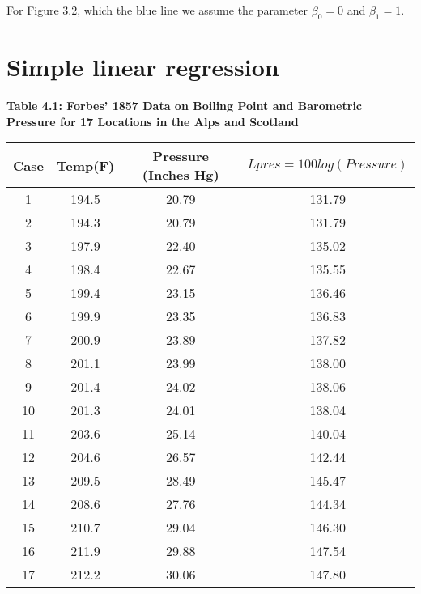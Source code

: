 \documentclass{article}
\begin{document}
\begin{center}
    \end{center}
    
    For Figure 3.2, which the blue line we assume the parameter ${\beta _{0} = 0}$ and ${\beta _{1} = 1}$.
    
\section{Simple linear regression} 

    \begin{center}
        \textbf{Table 4.1: Forbes’ 1857 Data on Boiling Point and Barometric Pressure for 17 Locations in the Alps and Scotland}
        
        \begin{tabular}{|cccc|}
            \hline 
            Case & Temp(F) & Pressure (Inches Hg) & ${Lpres=100log(Pressure)}$ \\
            \hline
            1 & 194.5 & 20.79 & 131.79 \\
            2 & 194.3 & 20.79 & 131.79 \\
            3 & 197.9 & 22.40 & 135.02 \\
            4 & 198.4 & 22.67 & 135.55 \\
            5 & 199.4 & 23.15 & 136.46 \\ 
            6 & 199.9 & 23.35 & 136.83 \\
            7 & 200.9 & 23.89 & 137.82 \\
            8 & 201.1 & 23.99 & 138.00 \\ 
            9 & 201.4 & 24.02 & 138.06 \\
            10 & 201.3 & 24.01 & 138.04 \\
            11 & 203.6 & 25.14 & 140.04 \\
            12 & 204.6 & 26.57 & 142.44 \\
            13 & 209.5 & 28.49 & 145.47 \\
            14 & 208.6 & 27.76 & 144.34 \\
            15 & 210.7 & 29.04 & 146.30 \\
            16 & 211.9 & 29.88 & 147.54 \\
            17 & 212.2 & 30.06 & 147.80 \\
            \hline
        \end{tabular}
    \end{center}
    
\end{document}
